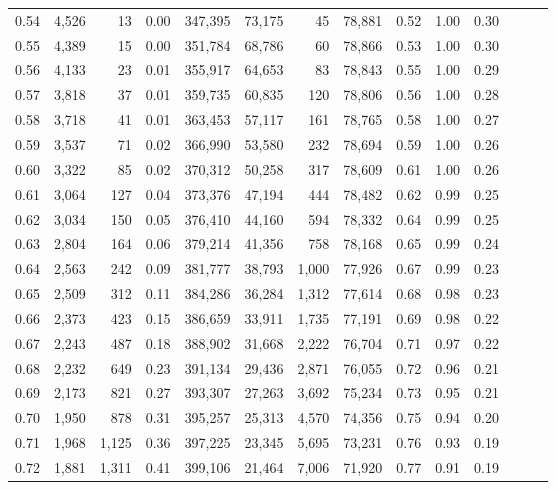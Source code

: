 \begin{tabular}{rrrrrrrrrrrrrr}
0.54 &  4,526 &     13 &  0.00 &  347,395 &   73,175 &      45 &  78,881 &  0.52 &  1.00 &      0.30 \\
0.55 &  4,389 &     15 &  0.00 &  351,784 &   68,786 &      60 &  78,866 &  0.53 &  1.00 &      0.30 \\
0.56 &  4,133 &     23 &  0.01 &  355,917 &   64,653 &      83 &  78,843 &  0.55 &  1.00 &      0.29 \\
0.57 &  3,818 &     37 &  0.01 &  359,735 &   60,835 &     120 &  78,806 &  0.56 &  1.00 &      0.28 \\
0.58 &  3,718 &     41 &  0.01 &  363,453 &   57,117 &     161 &  78,765 &  0.58 &  1.00 &      0.27 \\
0.59 &  3,537 &     71 &  0.02 &  366,990 &   53,580 &     232 &  78,694 &  0.59 &  1.00 &      0.26 \\
0.60 &  3,322 &     85 &  0.02 &  370,312 &   50,258 &     317 &  78,609 &  0.61 &  1.00 &      0.26 \\
0.61 &  3,064 &    127 &  0.04 &  373,376 &   47,194 &     444 &  78,482 &  0.62 &  0.99 &      0.25 \\
0.62 &  3,034 &    150 &  0.05 &  376,410 &   44,160 &     594 &  78,332 &  0.64 &  0.99 &      0.25 \\
0.63 &  2,804 &    164 &  0.06 &  379,214 &   41,356 &     758 &  78,168 &  0.65 &  0.99 &      0.24 \\
0.64 &  2,563 &    242 &  0.09 &  381,777 &   38,793 &   1,000 &  77,926 &  0.67 &  0.99 &      0.23 \\
0.65 &  2,509 &    312 &  0.11 &  384,286 &   36,284 &   1,312 &  77,614 &  0.68 &  0.98 &      0.23 \\
0.66 &  2,373 &    423 &  0.15 &  386,659 &   33,911 &   1,735 &  77,191 &  0.69 &  0.98 &      0.22 \\
0.67 &  2,243 &    487 &  0.18 &  388,902 &   31,668 &   2,222 &  76,704 &  0.71 &  0.97 &      0.22 \\
0.68 &  2,232 &    649 &  0.23 &  391,134 &   29,436 &   2,871 &  76,055 &  0.72 &  0.96 &      0.21 \\
0.69 &  2,173 &    821 &  0.27 &  393,307 &   27,263 &   3,692 &  75,234 &  0.73 &  0.95 &      0.21 \\
0.70 &  1,950 &    878 &  0.31 &  395,257 &   25,313 &   4,570 &  74,356 &  0.75 &  0.94 &      0.20 \\
0.71 &  1,968 &  1,125 &  0.36 &  397,225 &   23,345 &   5,695 &  73,231 &  0.76 &  0.93 &      0.19 \\
0.72 &  1,881 &  1,311 &  0.41 &  399,106 &   21,464 &   7,006 &  71,920 &  0.77 &  0.91 &      0.19 \\

\end{tabular}

